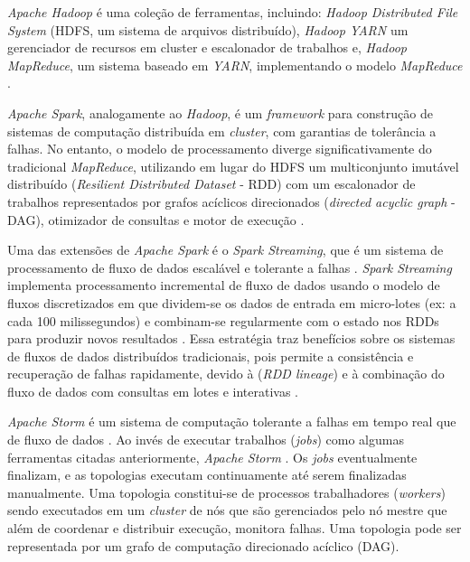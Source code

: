 \emph{Apache Hadoop} é uma coleção de ferramentas, incluindo: \emph{Hadoop
Distributed File System} (HDFS, um sistema de arquivos distribuído), \emph{Hadoop
YARN} um gerenciador de recursos em cluster e escalonador de trabalhos e,
\emph{Hadoop MapReduce}, um sistema baseado em \emph{YARN}, implementando o modelo
\emph{MapReduce} \cite{ApacheHadoop2020}.

\emph{Apache Spark}, analogamente ao \emph{Hadoop}, é um \emph{framework} para
construção de sistemas de computação distribuída em \emph{cluster}, com garantias
de tolerância a falhas.
No entanto, o modelo de processamento diverge
significativamente do tradicional \emph{MapReduce}, utilizando em lugar do HDFS
um multiconjunto imutável distribuído (\emph{Resilient Distributed Dataset}
- RDD) com um escalonador de trabalhos representados por grafos acíclicos
direcionados (\emph{directed acyclic graph} - DAG), otimizador de consultas e
motor de execução \cite{ApacheSpark2020}.

Uma das extensões de \emph{Apache Spark} é o \emph{Spark Streaming}, que é um
sistema de processamento de fluxo de dados 
escalável e tolerante a falhas
\cite{zaharia2016,sparkStreaming2016}.
\emph{Spark Streaming} implementa processamento incremental de fluxo de
dados usando o modelo de fluxos discretizados em que dividem-se os dados de entrada
em micro-lotes (ex: a cada 100 milissegundos) e combinam-se regularmente com o
estado nos RDDs para produzir novos resultados \cite{zaharia2016}.
Essa estratégia traz benefícios sobre os sistemas de fluxos de dados distribuídos
tradicionais, pois permite a consistência e recuperação de falhas rapidamente,
devido à  (\emph{RDD lineage})
e à combinação do fluxo de dados com
consultas em lotes e interativas \cite{sparkStreaming2016,Lopez2018}.

\emph{Apache Storm} é um sistema de computação tolerante a falhas em tempo
real que  de fluxo de dados
\cite{ApacheStorm2020,Lopez2018}.
Ao invés de executar trabalhos (\emph{jobs}) como algumas ferramentas citadas
anteriormente, \emph{Apache Storm} .
Os \emph{jobs} eventualmente finalizam, e as topologias executam continuamente até
serem finalizadas manualmente.
Uma topologia constitui-se de processos trabalhadores (\emph{workers}) sendo executados
em um \emph{cluster} de nós que são gerenciados pelo nó mestre que além de
coordenar e distribuir execução, monitora falhas.
Uma topologia pode ser representada por um grafo de computação direcionado
acíclico (DAG).

